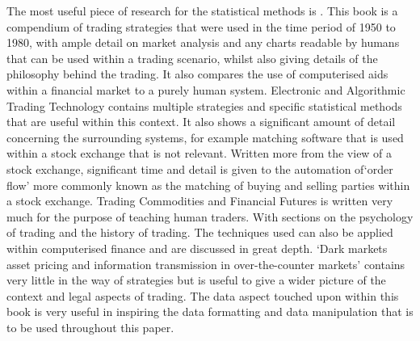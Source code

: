 \documentclass[conference]{IEEEtran}
\begin{document}
The most useful piece of research for the statistical methods is \cite{Murphy1999}. This book is a compendium of trading strategies that were used in the time period of 1950 to 1980, with ample detail on market analysis and any charts readable by humans that can be used within a trading scenario, whilst also giving details of the philosophy behind the trading. It also compares the use of computerised aids within a financial market to a purely human system. Electronic and Algorithmic Trading Technology \cite{Kim2007} contains multiple strategies and specific statistical methods that are useful within this context. It also shows a significant amount of detail concerning the surrounding systems, for example matching software that is used within a stock exchange that is not relevant. Written more from the view of a stock exchange, significant time and detail is given to the automation of`order flow' more commonly known as the matching of buying and selling parties within a stock exchange. Trading Commodities and Financial Futures \cite{Kleinman2005} is written very much for the purpose of teaching human traders. With sections on the psychology of trading and the history of trading. The techniques used can also be applied within computerised finance and are discussed in great depth. `Dark markets asset pricing and information transmission in over-the-counter markets' \cite{Duffie2012} contains very little in the way of strategies but is useful to give a wider picture of the context and legal aspects of trading. The data aspect touched upon within this book is very useful in inspiring the data formatting and data manipulation that is to be used throughout this paper.
\end{document}
